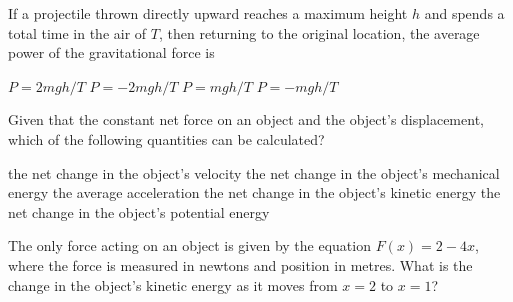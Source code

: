 \documentclass{../../../oss-apphys-exam}
\begin{document}
\begin{questions}
%    
    
  \question If a projectile thrown directly upward reaches a maximum height $h$
  and spends a total time in the air of $T$, then returning to the original
  location, the average power of the gravitational force is
  \begin{choices}
    \choice $P=2mgh/T$
    \choice $P=-2mgh/T$
    \choice $P=mgh/T$
    \choice $P=-mgh/T$
  \end{choices}
  
  \question Given that the constant net force on an object and the object's 
  displacement, which of the following quantities can be calculated?
  \begin{choices}
    \choice the net change in the object's velocity
    \choice the net change in the object's mechanical energy
    \choice the average acceleration
    \choice the net change in the object's kinetic energy
    \choice the net change in the object's potential energy
  \end{choices}
    
    
  \question The only force acting on an object is given by the equation
  $F(x)=2-4x$, where the force is measured in newtons and position in metres.
  What is the change in the object's kinetic energy as it moves from $x=2$ to
  $x=1$?
    

\end{questions}
\end{document}

